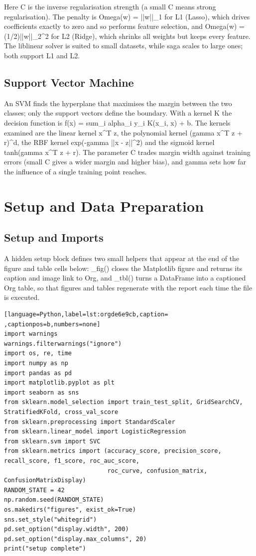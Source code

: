 \documentclass[11pt]{article}
\begin{document}
Here C is the inverse regularisation strength (a small C means strong regularisation). The
penalty is Omega(w) = ||w||\_1 for L1 (Lasso), which drives coefficients exactly to zero and
so performs feature selection, and Omega(w) = (1/2)||w||\_2\^{}2 for L2 (Ridge), which shrinks
all weights but keeps every feature. The liblinear solver is suited to small datasets, while
saga scales to large ones; both support L1 and L2.

\subsection*{Support Vector Machine}
\label{sec:org69524ad}


An SVM finds the hyperplane that maximises the margin between the two classes; only the
support vectors define the boundary. With a kernel K the decision function is f(x) = sum\_i
alpha\_i y\_i K(x\_i, x) + b. The kernels examined are the linear kernel x\^{}T z, the polynomial
kernel (gamma x\^{}T z + r)\^{}d, the RBF kernel exp(-gamma ||x - z||\^{}2) and the sigmoid kernel
tanh(gamma x\^{}T z + r). The parameter C trades margin width against training errors (small C
gives a wider margin and higher bias), and gamma sets how far the influence of a single
training point reaches.

\section*{Setup and Data Preparation}
\label{sec:org8efb8af}


\subsection*{Setup and Imports}
\label{sec:org502e7ea}


A hidden setup block defines two small helpers that appear at the end of the figure and
table cells below: \_fig() closes the Matplotlib figure and returns its caption and image
link to Org, and \_tbl() turns a DataFrame into a captioned Org table, so that figures and
tables regenerate with the report each time the file is executed.
\begin{lstlisting}[language=Python,label=lst:orgde6e9cb,caption= ,captionpos=b,numbers=none]
import warnings
warnings.filterwarnings("ignore")
import os, re, time
import numpy as np
import pandas as pd
import matplotlib.pyplot as plt
import seaborn as sns
from sklearn.model_selection import train_test_split, GridSearchCV, StratifiedKFold, cross_val_score
from sklearn.preprocessing import StandardScaler
from sklearn.linear_model import LogisticRegression
from sklearn.svm import SVC
from sklearn.metrics import (accuracy_score, precision_score, recall_score, f1_score, roc_auc_score,
                             roc_curve, confusion_matrix, ConfusionMatrixDisplay)
RANDOM_STATE = 42
np.random.seed(RANDOM_STATE)
os.makedirs("figures", exist_ok=True)
sns.set_style("whitegrid")
pd.set_option("display.width", 200)
pd.set_option("display.max_columns", 20)
print("setup complete")
\end{lstlisting}
\end{document}

